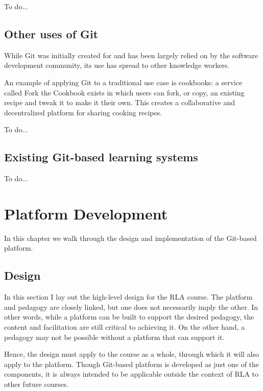 \documentclass[12pt,twoside,vi]{mitthesis}
\newcommand{\wip}[1]{{\color{red} To do...}}
\begin{document}
\wip{Use of group chats such as gitter and mattermost to complement projects}

\section{Other uses of Git}

While Git was initially created for and has been largely relied on by the software development community, its use has spread to other knowledge workers.

An example of applying Git to a traditional use case is cookbooks: a service called Fork the Cookbook exists in which users can fork, or copy, an existing recipe and tweak it to make it their own. This creates a collaborative and decentralized platform for sharing cooking recipes.~\cite{forkthecookbook}

\wip{Example applications include recipes, legislation, datasets, general CMS, etc.}

\section{Existing Git-based learning systems}

\wip{look through references}

\chapter{Platform Development}

In this chapter we walk through the design and implementation of the Git-based platform. 

\section{Design}

In this section I lay out the high-level design for the RLA course. The platform and pedagogy are closely linked, but one does not necessarily imply the other. In other words, while a platform can be built to support the desired pedagogy, the content and facilitation are still critical to achieving it. On the other hand, a pedagogy may not be possible without a platform that can support it. 

Hence, the design must apply to the course as a whole, through which it will also apply to the platform. Though Git-based platform is developed as just one of the components, it is always intended to be applicable outside the context of RLA to other future courses.
\end{document}
